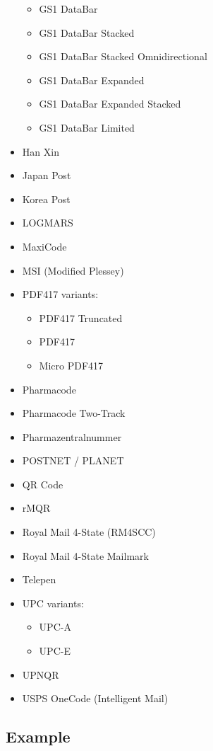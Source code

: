 \begin{itemize}
  \begin{itemize}
  \tightlist
  \item
    GS1 DataBar
  \item
    GS1 DataBar Stacked
  \item
    GS1 DataBar Stacked Omnidirectional
  \item
    GS1 DataBar Expanded
  \item
    GS1 DataBar Expanded Stacked
  \item
    GS1 DataBar Limited
  \end{itemize}
\item
  Han Xin
\item
  Japan Post
\item
  Korea Post
\item
  LOGMARS
\item
  MaxiCode
\item
  MSI (Modified Plessey)
\item
  PDF417 variants:

  \begin{itemize}
  \tightlist
  \item
    PDF417 Truncated
  \item
    PDF417
  \item
    Micro PDF417
  \end{itemize}
\item
  Pharmacode
\item
  Pharmacode Two-Track
\item
  Pharmazentralnummer
\item
  POSTNET / PLANET
\item
  QR Code
\item
  rMQR
\item
  Royal Mail 4-State (RM4SCC)
\item
  Royal Mail 4-State Mailmark
\item
  Telepen
\item
  UPC variants:

  \begin{itemize}
  \tightlist
  \item
    UPC-A
  \item
    UPC-E
  \end{itemize}
\item
  UPNQR
\item
  USPS OneCode (Intelligent Mail)
\end{itemize}

\subsection{Example}\label{example}

